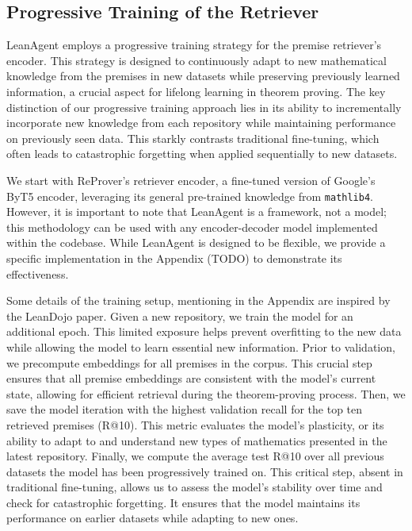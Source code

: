 \documentclass{article} %
\begin{document}
\subsection{Progressive Training of the Retriever}

LeanAgent employs a progressive training strategy for the premise retriever's encoder. This strategy is designed to continuously adapt to new mathematical knowledge from the premises in new datasets while preserving previously learned information, a crucial aspect for lifelong learning in theorem proving. The key distinction of our progressive training approach lies in its ability to incrementally incorporate new knowledge from each repository while maintaining performance on previously seen data. This starkly contrasts traditional fine-tuning, which often leads to catastrophic forgetting when applied sequentially to new datasets.

We start with ReProver's retriever encoder, a fine-tuned version of Google's ByT5 encoder, leveraging its general pre-trained knowledge from \texttt{mathlib4}. However, it is important to note that LeanAgent is a framework, not a model; this methodology can be used with any encoder-decoder model implemented within the codebase. While LeanAgent is designed to be flexible, we provide a specific implementation in the Appendix (TODO) to demonstrate its effectiveness.

Some details of the training setup, mentioning in the Appendix are inspired by the LeanDojo paper. Given a new repository, we train the model for an additional epoch. This limited exposure helps prevent overfitting to the new data while allowing the model to learn essential new information. Prior to validation, we precompute embeddings for all premises in the corpus. This crucial step ensures that all premise embeddings are consistent with the model's current state, allowing for efficient retrieval during the theorem-proving process. Then, we save the model iteration with the highest validation recall for the top ten retrieved premises (R@10). This metric evaluates the model's plasticity, or its ability to adapt to and understand new types of mathematics presented in the latest repository. Finally, we compute the average test R@10 over all previous datasets the model has been progressively trained on. This critical step, absent in traditional fine-tuning, allows us to assess the model's stability over time and check for catastrophic forgetting. It ensures that the model maintains its performance on earlier datasets while adapting to new ones.
\end{document}
